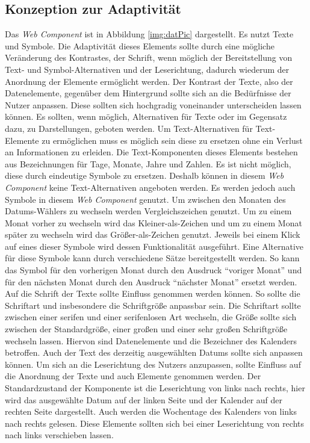 \documentclass[12pt, paper=a4, bibtotoc, toc=listof, headsepline=true]{scrreprt}
\begin{document}
		\subsection{Konzeption zur Adaptivität}
		Das \emph{Web Component} ist in Abbildung \ref{img:datPic} dargestellt. Es nutzt Texte und Symbole. Die Adaptivität dieses Elements sollte durch eine mögliche Veränderung des Kontrastes, der Schrift, wenn möglich der Bereitstellung von Text- und Symbol-Alternativen und der Leserichtung, dadurch wiederum der Anordnung der Elemente ermöglicht werden.
		\newline
		Der Kontrast der Texte, also der Datenelemente, gegenüber dem Hintergrund sollte sich an die Bedürfnisse der Nutzer anpassen. Diese sollten sich hochgradig voneinander unterscheiden lassen können. 
		Es sollten, wenn möglich, Alternativen für Texte oder im Gegensatz dazu, zu Darstellungen, geboten werden. Um Text-Alternativen für Text-Elemente zu ermöglichen muss es möglich sein diese zu ersetzen ohne ein Verlust an Informationen zu erleiden. Die Text-Komponenten dieses Elements bestehen aus Bezeichnungen für Tage, Monate, Jahre und Zahlen. Es ist nicht möglich, diese durch eindeutige Symbole zu ersetzen. Deshalb können in diesem \emph{Web Component} keine Text-Alternativen angeboten werden. Es werden jedoch auch Symbole in diesem \emph{Web Component} genutzt. Um zwischen den Monaten des Datums-Wählers zu wechseln werden Vergleichszeichen genutzt. Um zu einem Monat vorher zu wechseln wird das Kleiner-als-Zeichen und um zu einem Monat später zu wechseln wird das Größer-als-Zeichen genutzt. Jeweils bei einem Klick auf eines dieser Symbole wird dessen Funktionalität ausgeführt. Eine Alternative für diese Symbole kann durch verschiedene Sätze bereitgestellt werden. So kann das Symbol für den vorherigen Monat durch den Ausdruck \enquote{voriger Monat} und für den nächsten Monat durch den Ausdruck \enquote{nächster Monat} ersetzt werden.
		Auf die Schrift der Texte sollte Einfluss genommen werden können. So sollte die Schriftart und insbesondere die Schriftgröße anpassbar sein. Die Schriftart sollte zwischen einer serifen und einer serifenlosen Art wechseln, die Größe sollte sich zwischen der Standardgröße, einer großen und einer sehr großen Schriftgröße wechseln lassen. Hiervon sind Datenelemente und die Bezeichner des Kalenders betroffen. Auch der Text des derzeitig ausgewählten Datums sollte sich anpassen können.
		Um sich an die Leserichtung des Nutzers anzupassen, sollte Einfluss auf die Anordnung der Texte und auch Elemente genommen werden. Der Standardzustand der Komponente ist die Leserichtung von links nach rechts, hier wird das ausgewählte Datum auf der linken Seite und der Kalender auf der rechten Seite dargestellt. Auch werden die Wochentage des Kalenders von links nach rechts gelesen. Diese Elemente sollten sich bei einer Leserichtung von rechts nach links verschieben lassen.  
\end{document}
